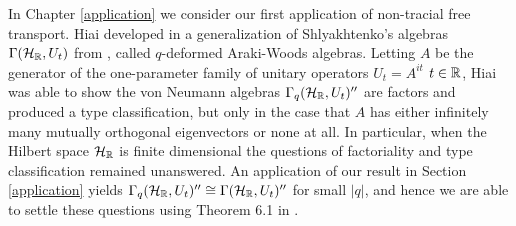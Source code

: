 In Chapter \ref{application} we consider our first application of non-tracial free transport. Hiai developed in \cite{Hia03} a generalization of Shlyakhtenko's algebras $\Gamma(\mathcal{H}_{\mathbb{R}}, U_t)$ from \cite{Shl97}, called $q$-deformed Araki-Woods algebras. Letting $A$ be the generator of the one-parameter family of unitary operators $U_t=A^{it}$ $t\in \mathbb{R}$, Hiai was able to show the von Neumann algebras $\Gamma_q(\mathcal{H}_{\mathbb{R}},U_t)''$ are factors and produced a type classification, but only in the case that $A$ has either infinitely many mutually orthogonal eigenvectors or none at all. In particular, when the Hilbert space $\mathcal{H}_{\mathbb{R}}$ is finite dimensional the questions of factoriality and type classification remained unanswered. An application of our result in Section \ref{application} yields $\Gamma_q(\mathcal{H}_{\mathbb{R}},U_t)''\cong \Gamma(\mathcal{H}_{\mathbb{R}},U_t)''$ for small $|q|$, and hence we are able to settle these questions using Theorem 6.1 in \cite{Shl97}.



